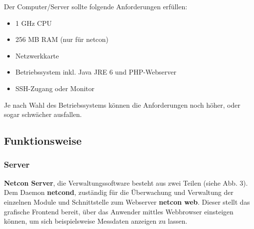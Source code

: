 \documentclass[a4paper,14pt,headsepline]{scrartcl}
\begin{document}
Der Computer/Server sollte folgende Anforderungen  erfüllen:

\begin{itemize}

\item 1 GHz CPU
\item 256 MB RAM (nur für netcon)
\item Netzwerkkarte
\item Betriebssystem inkl. Java JRE 6 und PHP-Webserver
\item SSH-Zugang oder Monitor

\end{itemize}

Je nach Wahl des Betriebssystems können die Anforderungen noch höher, oder sogar schwächer ausfallen.


\newpage
\subsection{Funktionsweise}

\subsubsection{Server}

\textbf{Netcon Server}, die Verwaltungssoftware besteht aus zwei Teilen (siehe Abb. 3). Dem Daemon \textbf{netcond}, zuständig für die Überwachung und Verwaltung der einzelnen Module und Schnittstelle zum Webserver \textbf{netcon web}. Dieser stellt das grafische Frontend bereit, über das Anwender mittles Webbrowser einsteigen können, um sich beispielsweise Messdaten anzeigen zu lassen. 

\begin{figure}[h]
\begin{center}
\end{center}
\end{figure}
\end{document}
